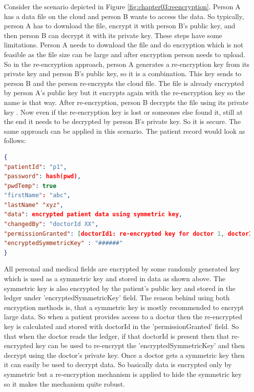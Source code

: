 Consider the scenario depicted in Figure \ref{fig:chapter03:reencryption}. Person A has a data file on the cloud and person B wants to access the data. So typically, person A has to download the file, encrypt it with person B's public key, and then person B can decrypt it with its private key. These steps have some limitations. Person A needs to download the file and do encryption which is not feasible as the file size can be large and after encryption person needs to upload. So in the re-encryption approach, person A generates a re-encryption key from its private key and person B's public key, so it is a combination. This key sends to person B and the person re-encrypts the cloud file. The file is already encrypted by person A's public key but it encrypts again with the re-encryption key so the name is that way. After re-encryption, person B decrypts the file using its private key \cite{Tith2020}. Now even if the re-encryption key is lost or someones else found it, still at the end it needs to be decrypted by person B's private key. So it is secure.
The same approach can be applied in this scenario. The patient record would look as follows:

\begin{lstlisting}[language=json,firstnumber=1]
{
"patientId": "p1",
"password": hash(pwd),
"pwdTemp": true
"firstName": "abc",
"lastName" "xyz",
"data": encrypted patient data using symmetric key,
"changedBy": "doctorId XX",
"permissionGranted": [doctorId1: re-encrypted key for doctor 1, doctorId2: re-encrypted key for doctor 2, ...],
"encryptedSymmetricKey" : "######"
}    
\end{lstlisting}

All personal and medical fields are encrypted by some randomly generated key which is used as a symmetric key and stored in data as shown above. The symmetric key is also encrypted by the patient's public key and stored in the ledger under 'encryptedSymmetricKey' field. The reason behind using both encryption methods is, that a symmetric key is mostly recommended to encrypt large data. So when a patient provides access to a doctor then the re-encrypted key is calculated and stored with doctorId in the 'permissionGranted' field. So that when the doctor reads the ledger, if that doctorId is present then that re-encrypted key can be used to re-encrypt the 'encryptedSymmetricKey' and then decrypt using the doctor's private key. Once a doctor gets a symmetric key then it can easily be used to decrypt data. So basically data is encrypted only by symmetric but a re-encryption mechanism is applied to hide the symmetric key so it makes the mechanism quite robust. 

